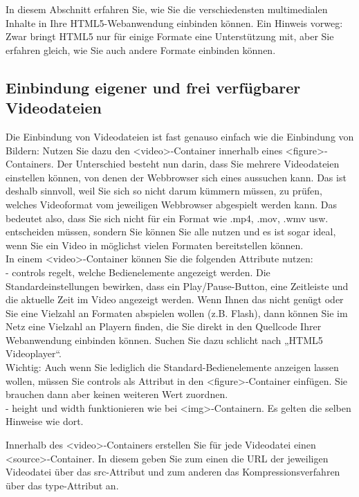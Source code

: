 In diesem Abschnitt erfahren Sie, wie Sie die verschiedensten multimedialen Inhalte in Ihre HTML5-Webanwendung einbinden können. Ein Hinweis vorweg: Zwar bringt HTML5 nur für einige Formate eine Unterstützung mit, aber Sie erfahren gleich, wie Sie auch andere Formate einbinden können.

\subsection{Einbindung eigener und frei verfügbarer Videodateien}

Die Einbindung von Videodateien ist fast genauso einfach wie die Einbindung von Bildern: Nutzen Sie dazu den <video>-Container innerhalb eines <figure>-Containers. Der Unterschied besteht nun darin, dass Sie mehrere Videodateien einstellen können, von denen der Webbrowser sich eines aussuchen kann. Das ist deshalb sinnvoll, weil Sie sich so nicht darum kümmern müssen, zu prüfen, welches Videoformat vom jeweiligen Webbrowser abgespielt werden kann. Das bedeutet also, dass Sie sich nicht für ein Format wie .mp4, .mov, .wmv usw. entscheiden müssen, sondern Sie können Sie alle nutzen und es ist sogar ideal, wenn Sie ein Video in möglichst vielen Formaten bereitstellen können.\\

In einem <video>-Container können Sie die folgenden Attribute nutzen:\\

-	controls regelt, welche Bedienelemente angezeigt werden. Die Standardeinstellungen bewirken, dass ein Play/Pause-Button, eine Zeitleiste und die aktuelle Zeit im Video angezeigt werden. Wenn Ihnen das nicht genügt oder Sie eine Vielzahl an Formaten abspielen wollen (z.B. Flash), dann können Sie im Netz eine Vielzahl an Playern finden, die Sie direkt in den Quellcode Ihrer Webanwendung einbinden können. Suchen Sie dazu schlicht nach „HTML5 Videoplayer“.\\

Wichtig: Auch wenn Sie lediglich die Standard-Bedienelemente anzeigen lassen wollen, müssen Sie controls als Attribut in den <figure>-Container einfügen. Sie brauchen dann aber keinen weiteren Wert zuordnen.\\

-	height und width funktionieren wie bei <img>-Containern. Es gelten die selben Hinweise wie dort.

Innerhalb des <video>-Containers erstellen Sie für jede Videodatei einen <source>-Container. In diesem geben Sie zum einen die URL der jeweiligen Videodatei über das src-Attribut und zum anderen das Kompressionsverfahren über das type-Attribut an.\\

